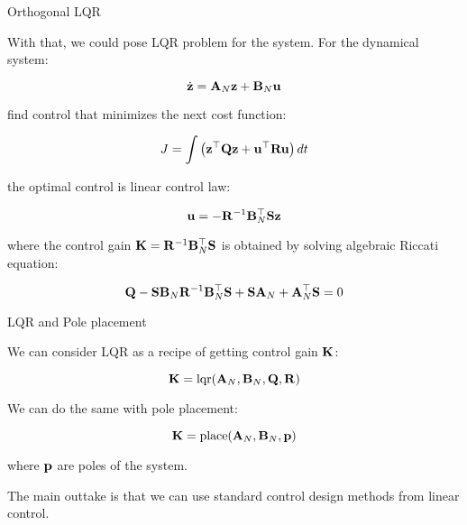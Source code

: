 \documentclass{beamer}
\begin{document}
\begin{frame}{Orthogonal LQR}
	\begin{flushleft}
		
		With that, we could pose LQR problem for the system. For the dynamical system:
		
		\begin{equation}
			\dot{\mathbf{z}}=\mathbf{A}_N\mathbf{z} +\mathbf{B}_N\mathbf{u}
		\end{equation}
		
		find control that minimizes the next cost function:
		
		\begin{equation}
			J = \int \left ( \mathbf{z}^\top \mathbf{Q} \mathbf{z} + \mathbf{u}^\top \mathbf{R} \mathbf{u} \right ) dt
		\end{equation}
		
		the optimal control is linear control law:
		
		\begin{equation}
			\mathbf{u}=-\mathbf{R}^{-1} \mathbf{B}_N^\top \mathbf{S} \mathbf{z}
		\end{equation}
		
		where the control gain $\mathbf{K} = \mathbf{R}^{-1} \mathbf{B}_N^\top \mathbf{S}$ is obtained by solving algebraic Riccati equation:
		
		\begin{equation}
			\mathbf{Q} - \mathbf{S} \mathbf{B}_N \mathbf{R}^{-1} \mathbf{B}_N^\top \mathbf{S} 
			+ \mathbf{S} \mathbf{A}_N + \mathbf{A}_N^\top \mathbf{S} = 0
		\end{equation}
		
		
	\end{flushleft}
\end{frame}



\begin{frame}{LQR and Pole placement}
	\begin{flushleft}
		
		We can consider LQR as a recipe of getting control gain $\mathbf{K}$:
		
		\begin{equation}
			\mathbf{K} = \text{lqr}(\mathbf{A}_N, \mathbf{B}_N, \mathbf{Q}, \mathbf{R})
		\end{equation}
	
		We can do the same with pole placement:
		
		\begin{equation}
			\mathbf{K} = \text{place}(\mathbf{A}_N, \mathbf{B}_N, \mathbf{p})
		\end{equation}
	
		where $\mathbf{p}$ are poles of the system.
		
		\bigskip
		
		The main outtake is that we can use standard control design methods from linear control. 
		
	\end{flushleft}
\end{frame}
\end{document}
